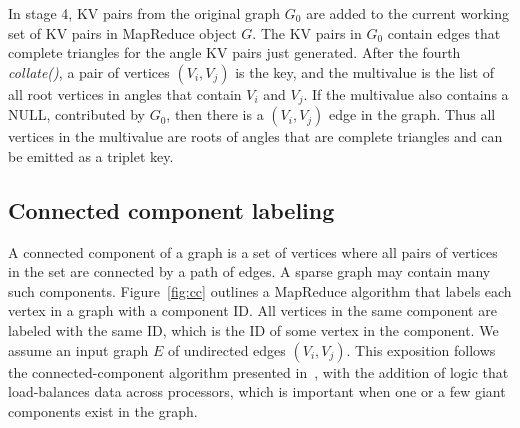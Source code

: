 In stage 4, KV pairs from the original graph $G_0$ are added to the
current working set of KV pairs in MapReduce object $G$.  The KV pairs
in $G_0$ contain edges that complete triangles for the angle KV pairs
just generated.  After the fourth {\it collate()}, a pair of vertices
$(V_i,V_j)$ is the key, and the multivalue is the list of all root
vertices in angles that contain $V_i$ and $V_j$.  If the multivalue
also contains a NULL, contributed by $G_0$, then there is a
$(V_i,V_j)$ edge in the graph.  Thus all vertices in the multivalue
are roots of angles that are complete triangles and can be emitted as
a triplet key.

\subsection{Connected component labeling}

A connected component of a graph is a set of vertices where all pairs
of vertices in the set are connected by a path of edges.  A sparse
graph may contain many such components.  Figure~\ref{fig:cc} outlines
a MapReduce algorithm that labels each vertex in a graph with a
component ID.  All vertices in the same component are labeled with
the same ID, which is the ID of some vertex in the component.  We
assume an input graph $E$ of undirected edges $(V_i,V_j)$.  This
exposition follows the connected-component algorithm presented
in~\cite{Cohen09}, with the addition of logic that load-balances data
across processors, which is important when one or a few giant
components exist in the graph.

